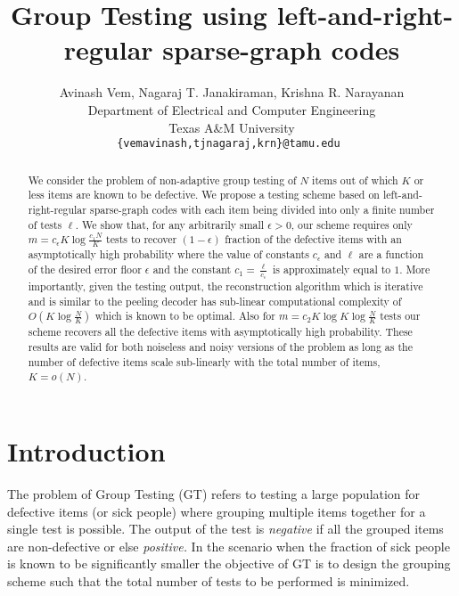 \documentclass[conference,,twocolumn]{IEEEtran}
\def\ceps{c_{\epsilon}}
\begin{document}
\title{Group Testing using left-and-right-regular sparse-graph codes}
\author{Avinash Vem, Nagaraj T. Janakiraman, Krishna R. Narayanan\\
Department of Electrical and Computer Engineering \\
Texas A\&M University\\
{\tt\small {\{vemavinash,tjnagaraj,krn\}@tamu.edu} }}

\maketitle
\begin{abstract} 
We consider the problem of non-adaptive group testing of $N$ items out of which $K$ or less items are known to be defective. We propose a testing scheme based on left-and-right-regular sparse-graph codes with each item being divided into only a finite number of tests $\ell$. We show that, for any arbitrarily small $\epsilon>0$, our scheme requires only $m=\ceps K\log \frac{c_1N}{K}$ tests to recover $(1-\epsilon)$ fraction of the defective items with an asymptotically high probability where the value of constants $\ceps$ and $\ell$ are a function of the desired error floor $\epsilon$  and the constant $c_1=\frac{\ell}{\ceps}$ is approximately equal to $1$. More importantly, given the testing output, the reconstruction algorithm which is iterative and is similar to the peeling decoder has sub-linear computational complexity of $O(K\log \frac{N}{K})$ which is known to be optimal. Also for $m=c_2 K\log K\log \frac{N}{K}$ tests our scheme recovers all the defective items with asymptotically high probability. These results are valid for both noiseless and noisy versions of the problem as long as the number of defective items scale sub-linearly with the total number of items, $K= o(N)$.
\end{abstract}

\section{Introduction}
The problem of Group Testing (GT) refers to testing a large population for defective items (or sick people) where grouping multiple items together for a single test is possible. The output of the test is \textit{negative} if all the grouped items are non-defective or else \textit{positive.} In the scenario when the fraction of sick people is known to be significantly smaller the objective of GT is to design the grouping scheme such that the total number of tests to be performed is minimized. 
\end{document}
